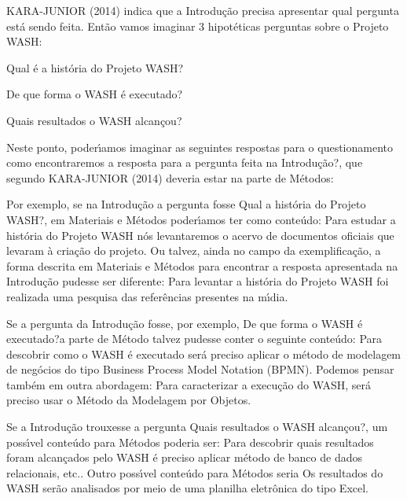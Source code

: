 \documentclass[
12pt,		%
openright,	%
twoside,  %
a4paper,			%
chapter=TITLE,		%
english,			%
french,				%
spanish,			%
brazil				%
]{USPSC-classe/USPSC_RedarTex}
\begin{document}
 KARA-JUNIOR (2014) indica que a Introdu\c{c}\~ao precisa apresentar qual pergunta est\'a sendo feita. Ent\~ao vamos imaginar 3 hipot\'eticas perguntas sobre o Projeto WASH:











\begin{alineas}
\item \textquotedbl Qual \'e a hist\'oria do Projeto WASH?\textquotedbl 
\item \textquotedbl De que forma o WASH \'e executado?\textquotedbl 
\item \textquotedbl Quais resultados o WASH alcan\c{c}ou?\textquotedbl 
\end{alineas}

Neste ponto, poder\'{\i}amos imaginar as seguintes respostas para o questionamento \textquotedbl como encontraremos a resposta para a pergunta feita na Introdu\c{c}\~ao?\textquotedbl , que segundo KARA-JUNIOR (2014) deveria estar na parte de M\'etodos:











\begin{alineas}
\item Por exemplo, se na Introdu\c{c}\~ao a pergunta fosse \textquotedbl Qual a hist\'oria do Projeto WASH?\textquotedbl , em Materiais e M\'etodos poder\'{\i}amos ter como  conte\'udo: \textquotedbl Para estudar a hist\'oria do Projeto WASH n\'os levantaremos o acervo de documentos oficiais que levaram \`a cria\c{c}\~ao do projeto\textquotedbl . Ou talvez, ainda no campo da exemplifica\c{c}\~ao, a forma descrita em Materiais e M\'etodos para  encontrar a resposta apresentada na Introdu\c{c}\~ao pudesse ser diferente: \textquotedbl Para levantar a hist\'oria do Projeto WASH foi realizada uma pesquisa das refer\^encias presentes na m\'{\i}dia\textquotedbl .
\item Se a pergunta da Introdu\c{c}\~ao fosse, por exemplo, \textquotedbl De que forma o WASH \'e executado?\textquotedbl  a parte de M\'etodo talvez pudesse conter o seguinte conte\'udo: \textquotedbl Para descobrir como o WASH \'e executado ser\'a preciso aplicar o m\'etodo de modelagem de neg\'ocios do tipo Business Process Model Notation (BPMN)\textquotedbl . Podemos pensar tamb\'em em outra abordagem: \textquotedbl Para caracterizar a execu\c{c}\~ao do WASH, ser\'a preciso usar o M\'etodo da Modelagem por Objetos\textquotedbl .
\item Se a Introdu\c{c}\~ao trouxesse a pergunta \textquotedbl Quais resultados o WASH alcan\c{c}ou?\textquotedbl , um poss\'{\i}vel conte\'udo para M\'etodos poderia ser: \textquotedbl Para descobrir quais resultados foram alcan\c{c}ados pelo WASH \'e preciso aplicar m\'etodo de banco de dados relacionais, etc.\textquotedbl . Outro poss\'{\i}vel conte\'udo para M\'etodos seria \textquotedbl Os resultados do WASH ser\~ao analisados por meio de uma planilha eletr\^onica do tipo Excel\textquotedbl .
\end{alineas}
\end{document}
